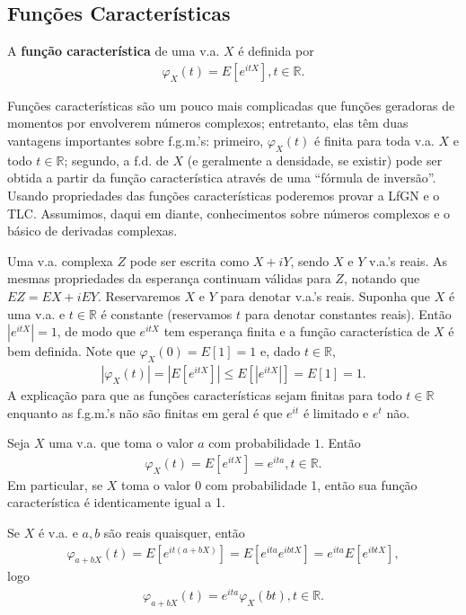 \documentclass[../Notas.tex]{subfiles}
\begin{document}
\subsection{Funções Características}
\begin{definition}
A \textbf{função característica} de uma v.a. $X$ é definida por
\begin{align*}
    \varphi_X(t) = E[e^{itX}], t\in\mathbb{R}.
\end{align*}
\end{definition}
Funções características são um pouco mais complicadas que funções geradoras de momentos por envolverem números complexos; entretanto, elas têm duas vantagens importantes sobre f.g.m.'s: primeiro, $\varphi_X(t)$ é finita para toda v.a. $X$ e todo $t\in\mathbb{R}$; segundo, a f.d. de $X$ (e geralmente a densidade, se existir) pode ser obtida a partir da função característica através de uma ``fórmula de inversão''. Usando propriedades das funções características poderemos provar a LfGN e o TLC. Assumimos, daqui em diante, conhecimentos sobre números complexos e o básico de derivadas complexas.

Uma v.a. complexa $Z$ pode ser escrita como $X+iY$, sendo $X$ e $Y$ v.a.'s reais. As mesmas propriedades da esperança continuam válidas para $Z$, notando que $EZ = EX + iEY$. Reservaremos $X$ e $Y$ para denotar v.a.'s reais. Suponha que $X$ é uma v.a. e $t\in\mathbb{R}$ é constante (reservamos $t$ para denotar constantes reais). Então $|e^{itX}| = 1$, de modo que $e^{itX}$ tem esperança finita e a função característica de $X$ é bem definida. Note que $\varphi_X(0) = E[1] = 1$ e, dado $t\in\mathbb{R}$,
\begin{align*}
    |\varphi_X(t)| = |E[e^{itX}]| \leq E[|e^{itX}|] = E[1] = 1.
\end{align*}
A explicação para que as funções características sejam finitas para todo $t\in\mathbb{R}$ enquanto as f.g.m.'s não são finitas em geral é que $e^{it}$ é limitado e $e^t$ não.

\begin{example}
    Seja $X$ uma v.a. que toma o valor $a$ com probabilidade $1$. Então
    \begin{align*}
        \varphi_X(t) = E[e^{itX}] = e^{ita}, t\in\mathbb{R}.
    \end{align*}
    Em particular, se $X$ toma o valor 0 com probabilidade 1, então sua função característica é identicamente igual a 1.
\end{example}
Se $X$ é v.a. e $a,b$ são reais quaisquer, então
\begin{align*}
    \varphi_{a+bX}(t) = E[e^{it(a+bX)}] = E[e^{ita}e^{ibtX}] = e^{ita}E[e^{ibtX}],
\end{align*}
logo
\begin{align*}
    \varphi_{a+bX}(t) = e^{ita}\varphi_X(bt), t\in\mathbb{R}.
\end{align*}
\end{document}
